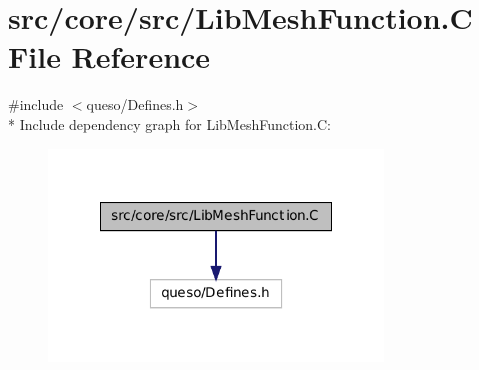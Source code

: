\hypertarget{_lib_mesh_function_8_c}{\section{src/core/src/\-Lib\-Mesh\-Function.C File Reference}
\label{_lib_mesh_function_8_c}
}
{\ttfamily \#include $<$queso/\-Defines.\-h$>$}\\*
Include dependency graph for Lib\-Mesh\-Function.\-C\-:
\nopagebreak
\begin{figure}[H]
\begin{center}
\leavevmode
\includegraphics[width=252pt]{_lib_mesh_function_8_c__incl}
\end{center}
\end{figure}
